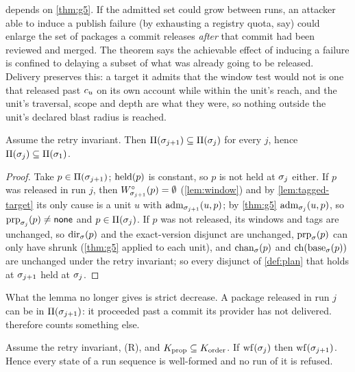 \begin{remark}
 depends on \cref{thm:g5}. If the admitted set could grow between
runs, an attacker able to induce a publish failure (by exhausting a
registry quota, say) could enlarge the set of packages a commit releases
\emph{after} that commit had been reviewed and merged. The theorem says the
achievable effect of inducing a failure is confined to delaying a subset of
what was already going to be released. Delivery preserves this: a target it
admits that the window test would not is one that released past $c_{u}$ on
its own account while within the unit's reach, and the unit's traversal,
scope and depth are what they were, so nothing outside the unit's declared
blast radius is reached.
\end{remark}

\begin{lemma}
\label{lem:plan-mono}
Assume the retry invariant. Then $\Pi(\sigma_{j+1}) \subseteq \Pi(\sigma_j)$ for
every $j$, hence $\Pi(\sigma_j) \subseteq \Pi(\sigma_1)$.
\end{lemma}

\begin{proof}
Take $p \in \Pi(\sigma_{j+1})$; $\mathrm{held}(p)$ is constant, so $p$ is not held at
$\sigma_j$ either. If $p$ was released in run $j$, then $W^{\circ}_{\sigma_{j+1}}(p) =
\emptyset$ (\cref{lem:window}) and by \cref{lem:tagged-target} its only cause
is a unit $u$ with $\mathrm{adm}_{\sigma_{j+1}}(u,p)$; by \cref{thm:g5}
$\mathrm{adm}_{\sigma_j}(u,p)$, so $\mathrm{prp}_{\sigma_j}(p) \neq \mathsf{none}$ and $p \in
\Pi(\sigma_j)$. If $p$ was not released, its windows and tags are unchanged, so
$\mathrm{dir}_{\sigma}(p)$ and the exact-version disjunct are unchanged,
$\mathrm{prp}_{\sigma}(p)$ can only have shrunk (\cref{thm:g5} applied to each unit),
and $\mathrm{chan}_{\sigma}(p)$ and $\mathrm{ch}(\mathrm{base}_{\sigma}(p))$ are unchanged under the
retry invariant; so every disjunct of \cref{def:plan} that holds at
$\sigma_{j+1}$ held at $\sigma_j$.
\end{proof}

What the lemma no longer gives is strict decrease. A package released in run
$j$ can be in $\Pi(\sigma_{j+1})$: it proceeded past a commit its provider has
not delivered.  therefore counts something else.

\begin{lemma}
\label{lem:wf}
Assume the retry invariant, (R), and $K_{\mathrm{prop}} \subseteq K_{\mathrm{order}}$. If
$\mathrm{wf}(\sigma_j)$ then $\mathrm{wf}(\sigma_{j+1})$. Hence every state of a run sequence is
well-formed and no run of it is refused.
\end{lemma}

